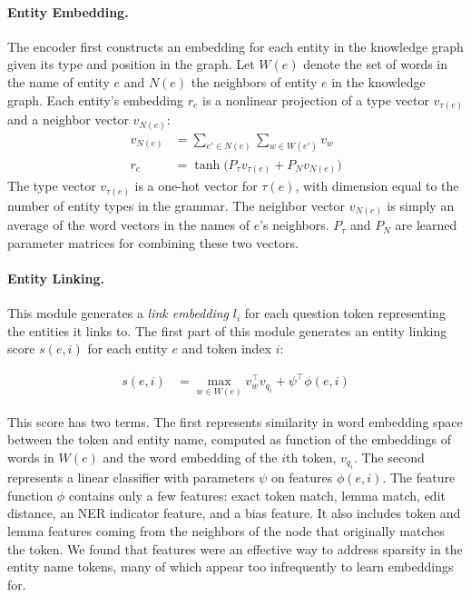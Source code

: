 \paragraph{Entity Embedding.}
The encoder first constructs an embedding for each entity in the knowledge 
graph given its type and position in the graph. 
Let $W(e)$ denote the set of words in the name of entity $e$ and $N(e)$ the 
neighbors of entity $e$ in the knowledge graph.
Each entity's embedding $r_e$ is a nonlinear projection of a type vector 
$v_{\tau(e)}$ and a neighbor vector $v_{N(e)}$:
\begin{align}
    v_{N(e)} &= \sum_{e' \in N(e)}\sum_{w \in W(e')}v_w \\
    r_e &= \tanh\big(P_\tau v_{\tau(e)} + P_N v_{N(e)}\big)
\end{align}
The type vector $v_{\tau(e)}$ is a one-hot vector for $\tau(e)$, with dimension 
equal to the number of entity types in the grammar. The neighbor vector 
$v_{N(e)}$ is simply an average of the word vectors in the names of $e$'s 
neighbors. $P_\tau$ and $P_N$ are learned parameter matrices for combining 
these two vectors.

\paragraph{Entity Linking.}
This module generates a \emph{link embedding} $l_{i}$ for each question token 
representing the entities it links to.
The first part of this module generates an entity linking score $s(e,i)$ 
for each entity $e$ and token index $i$:

\begin{align}
s(e,i) & = \max_{w \in W(e)} v_w^\intercal v_{q_i} + \psi^\intercal \phi(e,i)
\end{align}

This score has two terms. The first represents similarity in word embedding 
space between the token and entity name, computed as function of the embeddings 
of words in $W(e)$ and the word embedding of the $i$th token, $v_{q_i}$. The 
second represents a linear classifier with parameters $\psi$ on features 
$\phi(e,i)$.
The feature function $\phi$ contains only a few features: exact token match, 
lemma match, edit distance, an NER indicator feature, and a bias feature.
It also includes token and lemma features coming from the neighbors of the node
that originally matches the token. We found that features were an effective way
to address sparsity in the entity name tokens, many of which appear too 
infrequently
to learn embeddings for.

